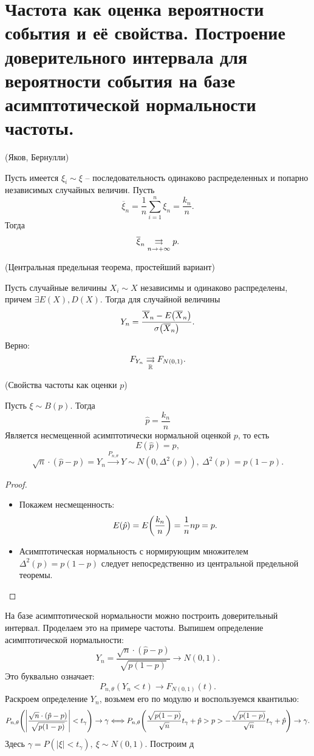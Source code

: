 \section{Частота как оценка вероятности события и её свойства.
    Построение доверительного интервала для вероятности события
на базе асимптотической нормальности частоты.}
\label{sec:normfreq}

\begin{theorem}(Яков, Бернулли)

	Пусть имеется $\xi_i \sim \xi$ -- последовательность одинаково
	распределенных и попарно независимых случайных величин. Пусть
	\[
		\overline{\xi}_n = \frac{1}{n} \sum_{i = 1}^n{\xi_n} = \frac{k_n}{n}
	.\]
	Тогда
	\[
		\overline{\xi}_n \underset{n \to +\infty}{\rightrightarrows} p
	.\]
\end{theorem}

\begin{theorem}(Центральная предельная теорема, простейший вариант)

	Пусть случайные величины $X_i \sim X$ независимы и одинаково распределены,
	причем $\exists E(X), D(X)$. Тогда для случайной величины
	\[
		Y_n = \frac{\overline{X}_n - E\parens*{\overline{X}_n}}
	{\sigma\parens*{\overline{X}_n}}
	.\]
	Верно:
	\[
		F_{Y_n} \underset{\mathbb{R}}{\rightrightarrows} F_{N(0, 1)}
	.\]
\end{theorem}

\begin{theorem}(Свойства частоты как оценки $p$)

	Пусть $\xi \sim B(p)$. Тогда
	\[
		\hat{p} = \frac{k_n}{n}
	\]
	Является несмещенной асимптотически нормальной оценкой $p$, то есть
	\[
		E(\hat{p}) = p,
	\]
	\[
		\sqrt{n} \cdot (\hat{p} - p) = Y_n \xrightarrow[]{P_{n, \theta}} Y
	\sim N(0, \Delta^2(p)),~ \Delta^2(p) = p(1 - p)
	.\]
\end{theorem}
\begin{proof}
	\enewline
	\begin{itemize}
		\item Покажем несмещенность:
			\[
				E(\hat{p}) = E\parens*{\frac{k_n}{n}} = \frac{1}{n} np = p
			.\]
		\item Асимптотическая нормальность с нормирующим множителем
			$\Delta^2(p) = p(1 - p)$ следует непосредственно из
			центральной предельной теоремы.
	\end{itemize}
\end{proof}

На базе асимптотической нормальности можно построить доверительный интервал.
Проделаем это на примере частоты. Выпишем определение асимптотической
нормальности:
\[
	Y_n = \frac{\sqrt{n} \cdot (\hat{p} - p)}{\sqrt{p(1 - p)}} \to N(0, 1)
.\]
Это буквально означает:
\[
	P_{n, \theta}(Y_n < t) \to F_{N(0, 1)}(t)
.\]
Раскроем определение $Y_n$, возьмем его по модулю и воспользуемся квантилью:
\[
	P_{n, \theta}\parens*{\abs*{\frac{\sqrt{n}
    \cdot (\hat{p} - p)}{\sqrt{p(1 - p)}} } < t_\gamma} \to \gamma \Llra
    P_{n, \theta}\parens*{\frac{\sqrt{p(1 - p)}}{\sqrt{n}}t_\gamma + \hat{p}
    > p > -\frac{\sqrt{p(1 - p)}}{\sqrt{n}}t_\gamma + \hat{p}} \to \gamma
.\]
Здесь $\gamma = P(|\xi| < t_\gamma),~ \xi \sim N(0, 1)$.
Построим д
